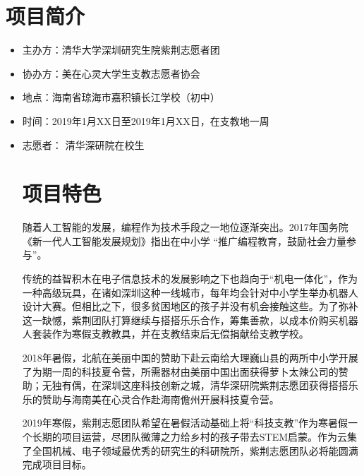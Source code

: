 \documentclass[12pt]{ctexart}
\begin{document}
\section{项目简介}
\begin{itemize}
\item 主办方：清华大学深圳研究生院紫荆志愿者团
\item 协办方：美在心灵大学生支教志愿者协会
\item 地点：海南省琼海市嘉积镇长江学校（初中）
\item 时间：2019年1月XX日至2019年1月XX日，在支教地一周
\item 志愿者： 清华深研院在校生
\section{项目特色}
随着人工智能的发展，编程作为技术手段之一地位逐渐突出。2017年国务院《新一代人工智能发展规划》指出在中小学
“推广编程教育，鼓励社会力量参与”。

传统的益智积木在电子信息技术的发展影响之下也趋向于“机电一体化”，作为一种高级玩具，在诸如深圳这种一线城市，每年均会针对中小学生举办机器人设计大赛。但相比之下，很多贫困地区的孩子并没有机会接触这些。为了弥补这一缺憾，紫荆团队打算继续与搭搭乐乐合作，筹集善款，以成本价购买机器人套装作为寒假支教教具，并在支教结束后无偿捐献给支教学校。

2018年暑假，北航在美丽中国的赞助下赴云南给大理巍山县的两所中小学开展了为期一周的科技夏令营，所需器材由美丽中国出面获得萝卜太辣公司的赞助；无独有偶，在深圳这座科技创新之城，清华深研院紫荆志愿团获得搭搭乐乐的赞助与海南美在心灵合作赴海南儋州开展科技夏令营。

2019年寒假，紫荆志愿团队希望在暑假活动基础上将“科技支教”作为寒暑假一个长期的项目运营，尽团队微薄之力给乡村的孩子带去STEM启蒙。作为云集了全国机械、电子领域最优秀的研究生的科研院所，紫荆志愿团队必将能圆满完成项目目标。
\end{itemize}
\end{document}
